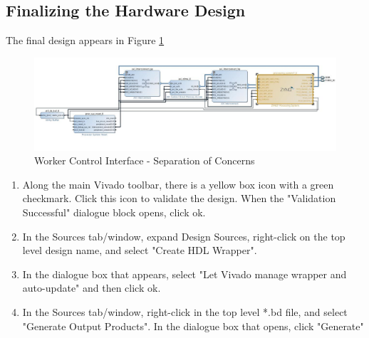 \documentclass[12pt]{article}
\begin{document}
\subsection{Finalizing the Hardware Design}
The final design appears in Figure \ref{fig:hardware_design}
\begin{figure}[H]
  \begin{center}
  \includegraphics[scale=0.5]{figures/hardware_design.jpeg}
  \caption{Worker Control Interface - Separation of Concerns}  \label{fig:hardware_design}
  \end{center}
\end{figure}
\begin{enumerate}
\item Along the main Vivado toolbar, there is a yellow box icon with a green checkmark.  Click this icon to validate the design. When the "Validation Successful" dialogue block opens, click ok.
\item In the Sources tab/window, expand Design Sources, right-click on the top level design name, and select "Create HDL Wrapper".
\item In the dialogue box that appears, select "Let Vivado manage wrapper and auto-update" and then click ok.
\item In the Sources tab/window, right-click in the top level *.bd file, and select "Generate Output Products".  In the dialogue box that opens, click "Generate"
\end{enumerate}
\end{document}
